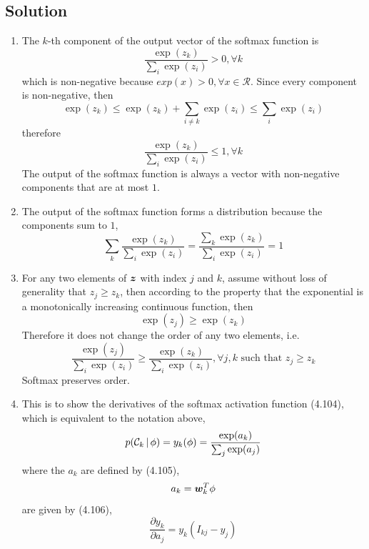 \documentclass[submit]{harvardml}
\begin{document}
\subsection*{Solution}

\begin{enumerate}
    \item The $k$-th component of the output vector of the softmax function is 
    $$ \frac{\exp(z_k)}{\sum_i\exp(z_i)} > 0, \forall k $$
    which is non-negative because $exp(x) > 0, \forall x \in \mathcal{R}$.
    Since every component is non-negative, then
    $$ \exp(z_k) \le \exp(z_k) + \sum_{i\neq k} \exp(z_i) \le \sum_{i} \exp(z_i) $$
    therefore 
    $$ \frac{\exp(z_k)}{\sum_i\exp(z_i)} \le 1, \forall k $$
    The output of the softmax function is always a vector with non-negative components that are at most $1$.
    \item The output of the softmax function forms a distribution because the components sum to $1$, 
    $$ \sum_k \frac{\exp(z_k)}{\sum_i\exp(z_i)} = \frac{\sum_k\exp(z_k)}{\sum_i\exp(z_i)} = 1 $$
    \item For any two elements of $\boldsymbol{z}$ with index $j$ and $k$, assume without loss of generality that $z_j \ge z_k$, then according to the property that the exponential is a monotonically increasing continuous function, then
    $$ \exp(z_j) \ge \exp(z_k) $$
    Therefore it does not change the order of any two elements, i.e. 
    $$ \frac{\exp(z_j)}{\sum_i\exp(z_i)} \ge \frac{\exp(z_k)}{\sum_i\exp(z_i)}, \forall j, k \text{ such that } z_j \ge z_k $$
    Softmax preserves order.
    \item This is to show the derivatives of the softmax activation function (4.104), which is equivalent to the notation above, 
    $$ p(\mathcal{C}_k \,|\, \phi) = y_k(\phi) = \frac{\exp(a_k)}{\sum_j \exp(a_j)} $$
    where the $a_k$ are defined by (4.105), 
    $$ a_k = \boldsymbol{w}_k^T \phi $$
    are given by (4.106),
    $$ \frac{\partial y_k}{\partial a_j} = y_k(I_{kj} - y_j) $$
    

\end{enumerate}
\end{document}
